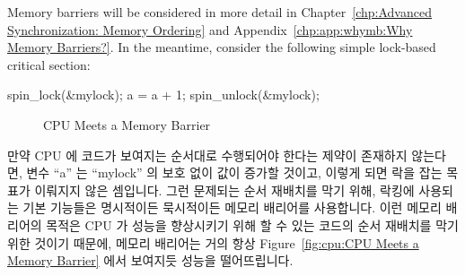 Memory barriers will be considered in more detail in
Chapter~\ref{chp:Advanced Synchronization: Memory Ordering} and
Appendix~\ref{chp:app:whymb:Why Memory Barriers?}.
In the meantime, consider the following simple lock-based critical
section:
\fi

\begin{VerbatimN}
spin_lock(&mylock);
a = a + 1;
spin_unlock(&mylock);
\end{VerbatimN}

\begin{figure}[tb]
\centering
{}
\caption{CPU Meets a Memory Barrier}
\end{figure}

만약 CPU 에 코드가 보여지는 순서대로 수행되어야 한다는 제약이 존재하지
않는다면, 변수 ``a'' 는 ``mylock'' 의 보호 없이 값이 증가할 것이고, 이렇게 되면
락을 잡는 목표가 이뤄지지 않은 셈입니다.
그런 문제되는 순서 재배치를 막기 위해, 락킹에 사용되는 기본 기능들은 명시적이든
묵시적이든 메모리 배리어를 사용합니다.
이런 메모리 배리어의 목적은 CPU 가 성능을 향상시키기 위해 할 수 있는 코드의
순서 재배치를 막기 위한 것이기 때문에, 메모리 배리어는 거의 항상
Figure~\ref{fig:cpu:CPU Meets a Memory Barrier} 에서 보여지듯 성능을
떨어뜨립니다.


